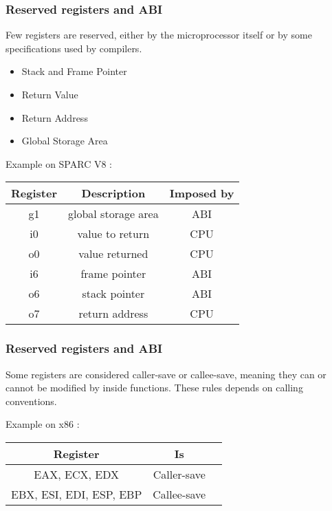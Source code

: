 
\begin{frame}
  \frametitle{Reserved registers and ABI}

  Few registers are reserved, either by the microprocessor itself or
  by some specifications used by compilers.

  \begin{itemize}
  \item
    Stack and Frame Pointer
  \item
    Return Value
  \item
    Return Address
  \item
    Global Storage Area
  \end{itemize}

  Example on SPARC V8 :

  \begin{center}
  \begin{tabular}{|c|c|c|}
    \hline
    Register & Description & Imposed by \\
    \hline
    g1 & global storage area & ABI \\
    \hline
    i0 & value to return & CPU \\
    \hline
    o0 & value returned & CPU \\
    \hline
    i6 & frame pointer & ABI \\
    \hline
    o6 & stack pointer & ABI \\
    \hline
    o7 & return address & CPU \\
    \hline
  \end{tabular}
  \end{center}

\end{frame}


\begin{frame}
  \frametitle{Reserved registers and ABI}

  Some registers are considered caller-save or callee-save, meaning
  they can or cannot be modified by inside functions. These rules
  depends on calling conventions.

  \-

  Example on x86 :

  \begin{center}
  \begin{tabular}{|c|c|c|}
    \hline
    Register & Is \\
    \hline
    EAX, ECX, EDX & Caller-save \\
    \hline
    EBX, ESI, EDI, ESP, EBP & Callee-save \\
    \hline
  \end{tabular}
  \end{center}

\end{frame}

